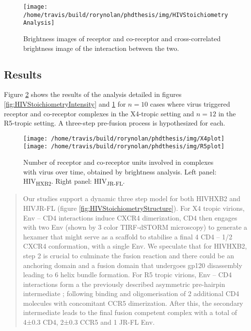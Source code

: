 \documentclass[12pt,]{book}
\theoremstyle{definition}
\theoremstyle{definition}
\theoremstyle{definition}
\theoremstyle{remark}
\begin{document}
\begin{figure}

\texttt{[image: /home/travis/build/rorynolan/phdthesis/img/HIVStoichiometryAnalysis]} \hfill{}

\caption{Brightness images of receptor and
co-receptor and cross-correlated brightness image of the interaction
between the two.}\label{fig:HIVStoichiometryAnalysis}
\end{figure}

\subsection{Results}\label{results}

Figure \ref{fig:HIVStoichiometryPlots} shows the results of the analysis
detailed in figures \ref{fig:HIVStoichiometryIntensity} and
\ref{fig:HIVStoichiometryAnalysis} for \(n=10\) cases where virus
triggered receptor and co-receptor complexes in the X4-tropic setting
and \(n=12\) in the R5-tropic setting. A three-step pre-fusion process
is hypothesized for each.






\begin{figure}

\texttt{[image: /home/travis/build/rorynolan/phdthesis/img/X4plot]} \texttt{[image: /home/travis/build/rorynolan/phdthesis/img/R5plot]} \hfill{}

\caption{Number of receptor and co-receptor
units involved in complexes with virus over time, obtained by brightness
analysis. Left panel: HIV\textsubscript{HXB2}. Right panel:
HIV\textsubscript{JR-FL}.}\label{fig:HIVStoichiometryPlots}
\end{figure}

\begin{quote}
Our studies support a dynamic three step model for both HIVHXB2 and
HIVJR-FL (figure \ref{fig:HIVStoichiometryStructure}). For X4 tropic
virions, Env -- CD4 interactions induce CXCR4 dimerization, CD4 then
engages with two Env (shown by 3 color TIRF-dSTORM microscopy) to
generate a hexamer that might serve as a scaffold to stabilise a final 4
CD4 -- 1/2 CXCR4 conformation, with a single Env. We speculate that for
HIVHXB2, step 2 is crucial to culminate the fusion reaction and there
could be an anchoring domain and a fusion domain that undergoes gp120
disassembly leading to 6 helix bundle formation. For R5 tropic virions,
Env -- CD4 interactions form a the previously described asymmetric
pre-hairpin intermediate \citep{Munro} \citep{DoKwon} \citep{Ma};
following binding and oligomerisation of 2 additional CD4 molecules with
concomitant CCR5 dimerization. After this, the secondary intermediate
leads to the final fusion competent complex with a total of 4±0.3 CD4,
2±0.3 CCR5 and 1 JR-FL Env.
\end{quote}
\end{document}
